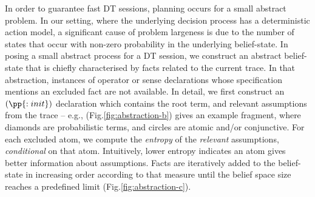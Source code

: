 In order to guarantee fast DT sessions, planning occurs for a small
abstract problem. In our setting, where the underlying decision
process has a deterministic action model, a significant cause of
problem largeness is due to the number of states that occur with
non-zero probability in the underlying belief-state. In posing a small
abstract process for a DT session, we construct an abstract
belief-state that is chiefly characterised by facts related to the
current trace. In that abstraction, instances of operator or sense
declarations whose specification mentions an excluded fact are not
available.
In detail, we first construct an $(\pp{:init})$ declaration which
contains the root term, and relevant assumptions from the trace --
e.g., (Fig.\ref{fig:abstraction-b}) gives an example fragment, where
diamonds are probabilistic terms, and circles are atomic and/or
conjunctive.
For each excluded atom, we compute the {\em entropy} of the {\em
relevant}
assumptions, {\em conditional} on that atom. Intuitively, lower
entropy indicates an atom gives better information about
assumptions. Facts are iteratively added to the belief-state in
increasing order according to that measure until the belief space size
reaches a predefined limit (Fig.\ref{fig:abstraction-c}).


